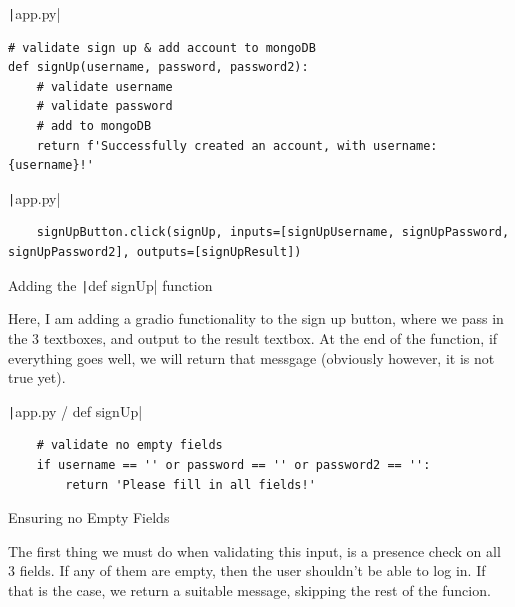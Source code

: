 \documentclass[12pt]{report}
\newcommand{\pil}[1]{\protect\texttt|#1|}
\begin{document}
\begin{listing}[H]
\pil{app.py}
\begin{verbatim}
# validate sign up & add account to mongoDB
def signUp(username, password, password2):
    # validate username
    # validate password
    # add to mongoDB
    return f'Successfully created an account, with username: {username}!'
\end{verbatim}
\pil{app.py}
\begin{verbatim}
    signUpButton.click(signUp, inputs=[signUpUsername, signUpPassword, signUpPassword2], outputs=[signUpResult])
\end{verbatim}
\caption{Adding the \pil{def signUp} function}\label{cs:signUp}
\end{listing}

Here, I am adding a gradio functionality to the sign up button, where we pass in the 3 textboxes, and output to the result textbox. At the end of the function, if everything goes well, we will return that messgage (obviously however, it is not true yet).

\begin{center}
\end{center}

\begin{listing}[H]
\pil{app.py / def signUp}
\begin{verbatim}
    # validate no empty fields
    if username == '' or password == '' or password2 == '':
        return 'Please fill in all fields!'
\end{verbatim}
\caption{Ensuring no Empty Fields}\label{cs:noEmptyFields}
\end{listing}

The first thing we must do when validating this input, is a presence check on all 3 fields. If any of them are empty, then the user shouldn't be able to log in. If that is the case, we return a suitable message, skipping the rest of the funcion.
\end{document}

